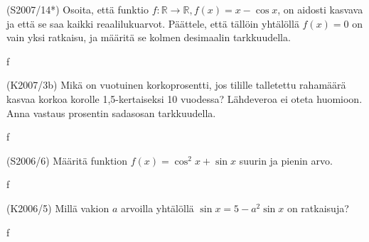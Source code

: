 \begin{tehtava} (S2007/14*)
	Osoita, että funktio $f \colon \mathbb{R}\to\mathbb{R}, f(x)=x-\cos x$, on aidosti kasvava ja 
	että se saa kaikki reaalilukuarvot. Päättele, että tällöin yhtälöllä $f(x)=0$ on vain yksi 
	ratkaisu, ja määritä se kolmen desimaalin tarkkuudella.
		\begin{vastaus}
			f
		\end{vastaus}
\end{tehtava}

\begin{tehtava} (K2007/3b)
	Mikä on vuotuinen korkoprosentti, jos tilille talletettu rahamäärä kasvaa korkoa korolle 
	1,5-kertaiseksi 10 vuodessa? Lähdeveroa ei oteta huomioon. Anna vastaus prosentin sadasosan 
	tarkkuudella.
		\begin{vastaus}
			f
		\end{vastaus}
\end{tehtava}

\begin{tehtava} (S2006/6)
	Määritä funktion $f(x)=\cos^2x+\sin x$ suurin ja pienin arvo.
		\begin{vastaus}
			f
		\end{vastaus}
\end{tehtava}

\begin{tehtava} (K2006/5)
	Millä vakion $a$ arvoilla yhtälöllä $\sin x=5-a^2\sin x$ on ratkaisuja?
		\begin{vastaus}
			f
		\end{vastaus}
\end{tehtava}
